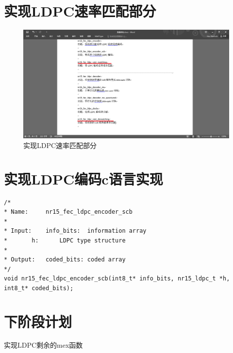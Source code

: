 \documentclass{article}
\begin{document}
\section{实现LDPC速率匹配部分}
\begin{figure}[H]
	\centering
	\includegraphics[width = \textwidth]{rm.png}
	\caption{实现LDPC速率匹配部分}
\end{figure}

\section{实现LDPC编码c语言实现}
\lstset{language=C++}
\begin{lstlisting}
/*
* Name:		nr15_fec_ldpc_encoder_scb
*
* Input:	info_bits:	information array
*		h:		LDPC type structure
*
* Output:	coded_bits:	coded array
*/
void nr15_fec_ldpc_encoder_scb(int8_t* info_bits, nr15_ldpc_t *h, int8_t* coded_bits);
\end{lstlisting}



\section{下阶段计划}
实现LDPC剩余的mex函数
\end{document}
